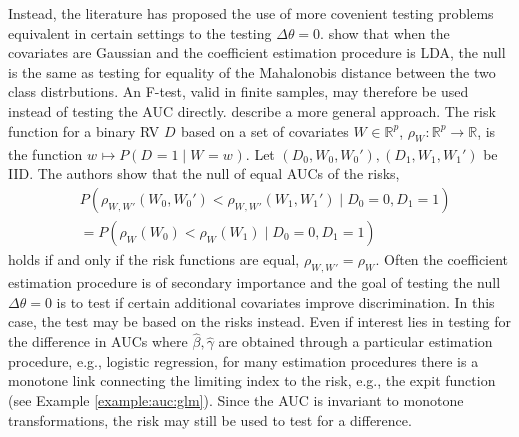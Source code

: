 \documentclass[12pt]{article}
\renewcommand{\P}{P}
\newcommand{\W}[1][]{W_{#1}}
\newcommand{\z}[1][]{w_{#1}}
\newcommand{\D}[1][]{D_{#1}}
\renewcommand{\star}[1]{{#1}^\ast}
\newcommand{\risk}[1][]{\rho_{#1}}
\newcommand{\auc}{\theta}
\newcommand{\aucdiff}{\Delta\auc}
\theoremstyle{definition}
\begin{document}
Instead, the literature has proposed the use of more covenient testing
problems equivalent in certain settings to the testing
$\aucdiff=0$. \citet{demler2011} show that when the covariates are
Gaussian and the coefficient estimation procedure is LDA, the null is
the same as testing for equality of the Mahalonobis distance between
the two class distrbutions. An F-test, valid in finite samples, may
therefore be used instead of testing the AUC directly.
\citet{pepe2013} describe a more general
approach. %
The risk function for a binary RV $\D$ based on a set of covariates
$\W\in\mathbb{R}^p$, $\risk[\W]:\mathbb{R}^p\to\mathbb{R}$, is the
function $\z \mapsto \P(\D=1 \mid \W=\z)$. Let
$(\D[0],\W[0],\W[0]'),(\D[1],\W[1],\W[1]')$ be IID. The authors show
that the null of equal AUCs of the risks,
\begin{align}
  &\P(\risk[{\W,\W'}](\W[0],\W[0]') < \risk[{\W,\W'}](\W[1],\W[1]') \mid \D[0]=0,\D[1]=1)\\
  &=
  \P(\risk[{\W}](\W[0]) < \risk[{\W}](\W[1]) \mid \D[0]=0,\D[1]=1)
\end{align}
holds if and only if the risk functions are equal,
$\risk[{\W,\W'}]=\risk[\W]$. Often the coefficient
estimation procedure is of secondary importance and the goal of
testing the null $\aucdiff=0$ is to test if certain additional
covariates improve discrimination. In this case, the test may be based
on the risks instead. Even if interest lies in testing for the
difference in AUCs where $\hat\beta,\hat\gamma$ are obtained through a
particular estimation procedure, e.g., logistic
regression, %
for many estimation procedures there is a monotone link connecting the limiting index to the risk,
e.g., the expit function (see Example \ref{example:auc:glm}). Since the AUC is invariant to monotone
transformations, the risk may still be used to test for a
difference. %
\end{document}
